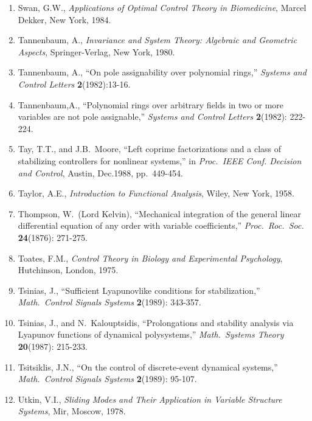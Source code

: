 \begin{enumerate}
\item
Swan, G.W., {\it Applications of Optimal Control Theory in Biomedicine},
Marcel Dekker, New York, 1984.

\item
Tannenbaum, A., {\it Invariance and System Theory: Algebraic and Geometric
Aspects}, Springer-Verlag, New York, 1980.

\item
Tannenbaum, A., ``On pole assignability over polynomial rings,'' {\it Systems
and Control Letters} {\bf 2}(1982):13-16.

\item
Tannenbaum,A., ``Polynomial rings over arbitrary fields in two or more
variables are not pole assignable,'' {\it Systems and Control Letters} {\bf
2}(1982): 222-224.

\item
Tay, T.T., and J.B.\ Moore, ``Left coprime factorizations and a class of
stabilizing controllers for nonlinear systems,'' in {\it Proc.\ IEEE Conf.
Decision and Control}, Austin, Dec.1988, pp.\ 449-454.

\item
Taylor, A.E., {\it Introduction to Functional Analysis}, Wiley, New York,
1958.

\item
Thompson, W.\ (Lord Kelvin), ``Mechanical integration of the general linear
differential equation of any order with variable coefficients,'' {\it Proc.\
Roc.\ Soc.} {\bf 24}(1876): 271-275.

\item
Toates, F.M., {\it Control Theory in Biology and Experimental Psychology},
Hutchinson, London, 1975.

\item
Tsinias, J., ``Sufficient Lyapunovlike conditions for stabilization,'' {\it
Math.\ Control Signals Systems} {\bf 2}(1989): 343-357.

\item
Tsinias, J., and N.\ Kalouptsidis, ``Prolongations and stability analysis via
Lyapunov functions of dynamical polysystems,'' {\it Math.\ Systems Theory}
{\bf 20}(1987): 215-233.

\item
Tsitsiklis, J.N., ``On the control of discrete-event dynamical systems,'' {\it
Math.\ Control Signals Systems} {\bf 2}(1989): 95-107.

\item
Utkin, V.I., {\it Sliding Modes and Their Application in Variable Structure
Systems}, Mir, Moscow, 1978.


\end{enumerate}

